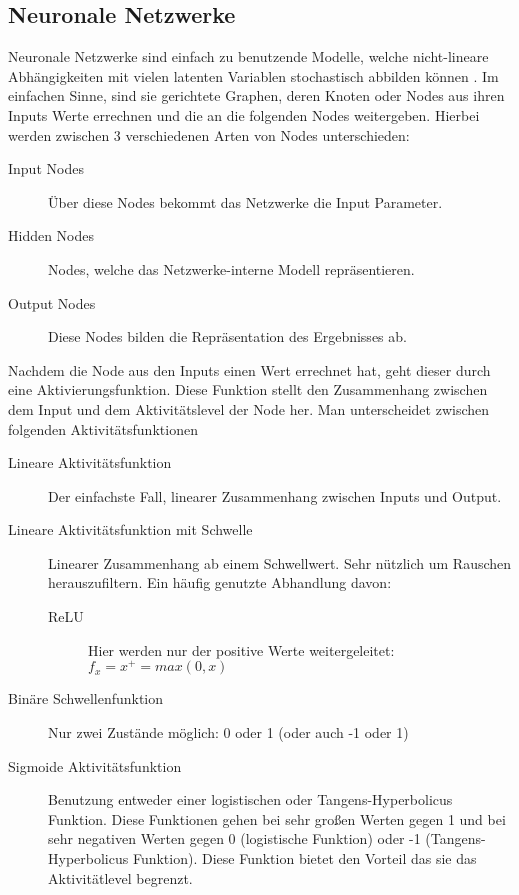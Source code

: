 \documentclass[pdftex,a4paper,halfparskip]{scrartcl}
\begin{document}
\subsection{Neuronale Netzwerke}
Neuronale Netzwerke sind einfach zu benutzende Modelle, welche nicht-lineare Abhängigkeiten mit vielen latenten Variablen stochastisch abbilden können \cite{nnWebsite}. Im einfachen Sinne, sind sie gerichtete Graphen, deren Knoten oder Nodes aus ihren Inputs Werte errechnen und die an die folgenden Nodes weitergeben. Hierbei werden zwischen 3 verschiedenen Arten von Nodes unterschieden:

\begin{description}
	\item[Input Nodes] Über diese Nodes bekommt das Netzwerke die Input Parameter.
	\item[Hidden Nodes] Nodes, welche das Netzwerke-interne Modell repräsentieren.
	\item[Output Nodes] Diese Nodes bilden die Repräsentation des Ergebnisses ab.
\end{description}

Nachdem die Node aus den Inputs einen Wert errechnet hat, geht dieser durch eine Aktivierungsfunktion. Diese Funktion stellt den Zusammenhang zwischen dem Input und dem Aktivitätslevel der Node her. Man unterscheidet zwischen folgenden Aktivitätsfunktionen

\begin{description}
	\item[Lineare Aktivitätsfunktion] Der einfachste Fall, linearer Zusammenhang zwischen Inputs und Output.
	\item[Lineare Aktivitätsfunktion mit Schwelle] Linearer Zusammenhang ab einem Schwellwert. Sehr nützlich um Rauschen herauszufiltern. Ein häufig genutzte Abhandlung davon:
	\begin{description}
		\item[ReLU] Hier werden nur der positive Werte weitergeleitet: \(f_x = x^+ = max(0,x) \)
	\end{description}
	\item[Binäre Schwellenfunktion] Nur zwei Zustände möglich: 0 oder 1 (oder auch -1 oder 1)
	\item[Sigmoide Aktivitätsfunktion] Benutzung entweder einer logistischen oder Tangens-Hyperbolicus Funktion. Diese Funktionen gehen bei sehr großen Werten gegen 1 und bei sehr negativen Werten gegen 0 (logistische Funktion) oder -1 (Tangens-Hyperbolicus Funktion). Diese Funktion bietet den Vorteil das sie das Aktivitätlevel begrenzt.
\end{description} 
\end{document}

